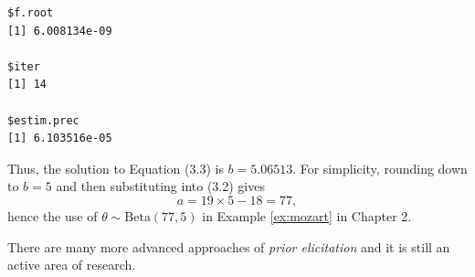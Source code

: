 {\begin{verbatim}
$f.root
[1] 6.008134e-09

$iter
[1] 14

$estim.prec
[1] 6.103516e-05
\end{verbatim}















Thus, the solution to Equation (3.3) is $b=5.06513$.  For simplicity, rounding down to $b=5$ and then substituting into (3.2) gives
$$
a = 19 \times 5 -18 = 77,
$$
hence the use of $\theta \sim \mathrm{Beta}(77,5)$ in Example \ref{ex:mozart} in Chapter 2.}

There are many more advanced approaches of \emph{prior elicitation} and it is still an active area of research.

\clearpage



















































































